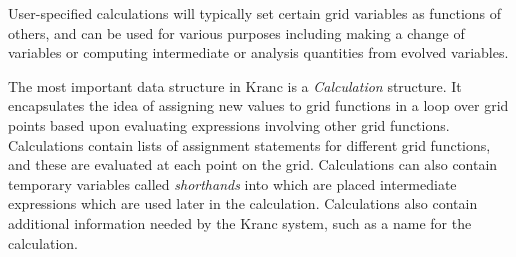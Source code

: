 \documentclass{report}
\begin{document}
User-specified calculations will typically set certain grid variables
as functions of others, and can be used for various purposes including
making a change of variables or computing intermediate or analysis
quantities from evolved variables.

The most important data structure in Kranc is a {\em Calculation}
structure.  It encapsulates the idea of assigning new values to grid
functions in a loop over grid points based upon evaluating expressions
involving other grid functions.  Calculations contain lists of
assignment statements for different grid functions, and these are
evaluated at each point on the grid.  Calculations can also contain
temporary variables called {\em shorthands} into which are placed
intermediate expressions which are used later in the
calculation.  Calculations also contain additional information needed
by the Kranc system, such as a name for the calculation.







\end{document}
